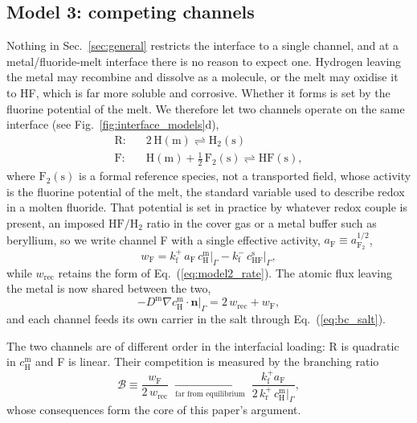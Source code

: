 \documentclass[5p]{elsarticle}
\newcommand{\cm}[1]{c^{\mathrm{m}}_{#1}}   %
\newcommand{\cs}[1]{c^{\mathrm{s}}_{#1}}   %
\newcommand{\Bra}{\mathcal{B}}             %
\begin{document}
\subsection{Model 3: competing channels}
\label{sec:model3}

Nothing in Sec.~\ref{sec:general} restricts the interface to a single channel, and at a metal/fluoride-melt interface there is no reason to expect one. 
Hydrogen leaving the metal may recombine and dissolve as a molecule, or the melt may oxidise it to HF, which is far more soluble and corrosive.
Whether it forms is set by the fluorine potential of the melt.
We therefore let two channels operate on the same interface (see Fig.~\ref{fig:interface_models}d),
\begin{align*}
    \text{R:}&\quad 2\,\mathrm{H(m)} \rightleftharpoons \mathrm{H_2(s)} \\
    \text{F:}&\quad \mathrm{H(m)} + \tfrac{1}{2}\,\mathrm{F_2(s)}
                    \rightleftharpoons \mathrm{HF(s)} ,
\end{align*}
where $\mathrm{F_2(s)}$ is a formal reference species, not a transported field, whose activity is the fluorine potential of the melt, the standard variable used to describe redox in a molten fluoride.
That potential is set in practice by whatever redox couple is present, an imposed $\mathrm{HF/H_2}$ ratio in the cover gas or a metal buffer such as beryllium, so we write channel F with a single effective activity, $a_\mathrm{F} \equiv a_{\mathrm{F_2}}^{1/2}$,
\begin{equation}
    w_{\mathrm{F}} = k_{\mathrm{f}}^{+}\, a_{\mathrm{F}}\,
                     \cm{\mathrm{H}}\big|_\Gamma
                   - k_{\mathrm{f}}^{-}\,\cs{\mathrm{HF}}\big|_\Gamma ,
    \label{eq:model3_rate}
\end{equation}
while $w_\mathrm{rec}$ retains the form of Eq.~(\ref{eq:model2_rate}). 
The atomic flux leaving the metal is now shared between the two,
\begin{equation}
    -D^{\mathrm{m}}\nabla \cm{\mathrm{H}}\cdot\mathbf{n}\big|_\Gamma
    = 2\,w_{\mathrm{rec}} + w_{\mathrm{F}} ,
    \label{eq:model3_total_flux}
\end{equation}
and each channel feeds its own carrier in the salt through Eq.~(\ref{eq:bc_salt}).

The two channels are of different order in the interfacial loading: R is quadratic in $\cm{\mathrm{H}}$ and F is linear.
Their competition is measured by the branching ratio
\begin{equation}
    \Bra
    \equiv \frac{w_{\mathrm{F}}}{2\,w_{\mathrm{rec}}}
    \;\xrightarrow[\text{far from equilibrium}]{}\;
    \frac{k_{\mathrm{f}}^{+} a_{\mathrm{F}}}
         {2\,k_{\mathrm{r}}^{+}\,\cm{\mathrm{H}}\big|_\Gamma} ,
    \label{eq:branching}
\end{equation}
whose consequences form the core of this paper's argument.
\end{document}
